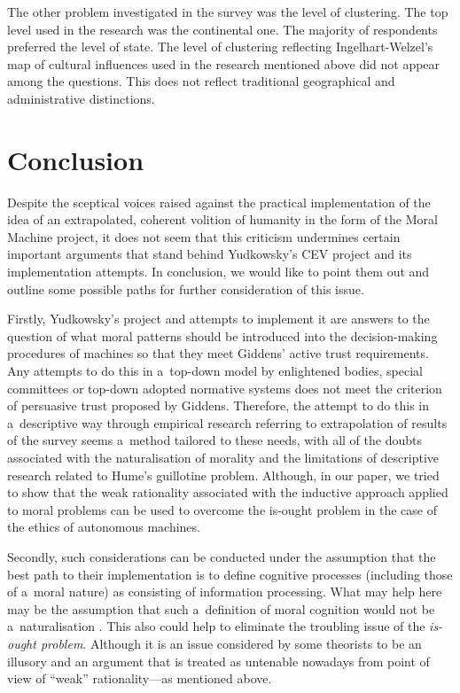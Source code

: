 The other problem investigated in the survey was the level of clustering. The top level used in the research was the continental one. The majority of respondents preferred the level of state. The level of clustering reflecting Ingelhart-Welzel's map of cultural influences used in the research mentioned above did not appear among the questions. This does not reflect traditional geographical and administrative distinctions.

\section*{Conclusion}
Despite the sceptical voices raised against the practical implementation of the idea of an extrapolated, coherent volition of humanity in the form of the Moral Machine project, it does not seem that this criticism undermines certain important arguments that stand behind Yudkowsky's CEV project and its implementation attempts. In conclusion, we would like to point them out and outline some possible paths for further consideration of this issue.

Firstly, Yudkowsky's project and attempts to implement it are answers to the question of what moral patterns should be introduced into the decision-making procedures of machines so that they meet Giddens' active trust requirements. Any attempts to do this in a~top-down model by enlightened bodies, special committees or top-down adopted normative systems does not meet the criterion of persuasive trust proposed by Giddens. Therefore, the attempt to do this in a~descriptive way through empirical research referring to extrapolation of results of the survey seems a~method tailored to these needs, with all of the doubts associated with the naturalisation of morality and the limitations of descriptive research related to Hume's guillotine problem. Although, in our paper, we tried to show that the weak rationality associated with the inductive approach applied to moral problems can be used to overcome the is-ought problem in the case of the ethics of autonomous machines.

Secondly, such considerations can be conducted under the assumption that the best path to their implementation is to define cognitive processes (including those of a~moral nature) as consisting of information processing. What may help here may be the assumption that such a~definition of moral cognition would not be a~naturalisation
\parencite[][]{peruzzi_beginners_2015}. %
 This also could help to eliminate the troubling issue of the \textit{is-ought problem}. Although it is an issue considered by some theorists to be an illusory 
\parencite[][]{gellner_words_2005} %
 and an argument that is treated as untenable nowadays 
\parencite[][]{searle_how_1964} %
 from point of view of ``weak'' rationality—as mentioned above.

